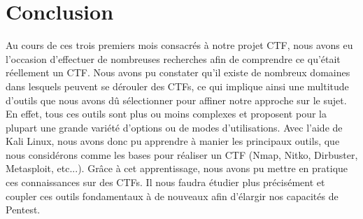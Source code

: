 \chapter*{Conclusion}
\label{chap:Mini Projet}

Au cours de ces trois premiers mois consacrés à notre projet CTF, nous avons eu l'occasion d'effectuer de nombreuses recherches afin de comprendre ce qu'était réellement un CTF.
Nous avons pu constater qu'il existe de nombreux domaines dans lesquels peuvent se dérouler des CTFs, ce qui implique ainsi une multitude d'outils que nous avons dû sélectionner pour affiner notre approche sur le sujet. En effet, tous ces outils sont plus ou moins complexes et proposent pour la plupart une grande variété d'options ou de modes d'utilisations.
Avec l'aide de Kali Linux, nous avons donc pu apprendre à manier les principaux outils, que nous considérons comme les bases pour réaliser un CTF (Nmap, Nitko, Dirbuster, Metasploit, etc...).
Grâce à cet apprentissage, nous avons pu mettre en pratique ces connaissances sur des CTFs.
Il nous faudra étudier plus précisément et coupler ces outils fondamentaux à de nouveaux afin d'élargir nos capacités de Pentest.
